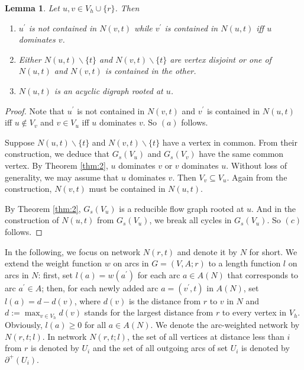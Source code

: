 \documentclass[11pt]{article}
\newtheorem{lemma}[theorem]{Lemma}
\begin{document}
\begin{lemma}
\label{lem:1}
Let $u,v\in V_h\cup\{r\}$. Then
\begin{enumerate}[label=\emph{(}\alph*\emph{)}]
  \item $u^\prime$ is not contained in $N(v,t)$ while $v^\prime$ is contained in $N(u,t)$ iff $u$ dominates $v$.
  \item Either $N(u,t)\backslash\{t\}$ and $N(v,t)\backslash\{t\}$ are vertex disjoint or one of $N(u,t)$ and $N(v,t)$ is contained in the other.
  \item $N(u,t)$ is an acyclic digraph rooted at $u$.
\end{enumerate}
\end{lemma}
\begin{proof}
Note that $u^\prime$ is not contained in $N(v,t)$ and $v^\prime$ is contained in $N(u,t)$ iff $u\not\in V_v$ and $v\in V_u$ iff $u$ dominates $v$. So $(a)$ follows.

Suppose $N(u,t)\backslash\{t\}$ and $N(v,t)\backslash\{t\}$ have a vertex in common. From their construction, we deduce that $G_s(V_u)$ and $G_s(V_v)$ have the same common vertex. By Theorem \ref{thm:2}, $u$ dominates $v$ or $v$ dominates $u$. Without loss of generality, we may assume that $u$ dominates $v$. Then $V_v\subseteq V_u$. Again from the construction, $N(v,t)$ must be contained in $N(u,t)$.

By Theorem \ref{thm:2}, $G_s(V_u)$ is a reducible flow graph rooted at $u$. And in the construction of $N(u,t)$ from $G_s(V_u)$, we break all cycles in $G_s(V_u)$. So $(c)$ follows.
\end{proof}

In the following, we focus on network $N(r,t)$ and denote it by $N$ for short. We extend the weight function $w$ on arcs in $G=(V,A;r)$ to a length function $l$ on arcs in $N$: first, set $l(a)=w(a^\prime)$ for each arc $a\in A(N)$ that corresponds to arc $a^\prime\in A$; then, for each newly added arc $a=(v^\prime,t)$ in $A(N)$, set $l(a)=d-d(v)$, where $d(v)$ is the distance from $r$ to $v$ in $N$ and $d:=\max_{v\in V_h} d(v)$ stands for the largest distance from $r$ to every vertex in $V_h$. Obviously, $l(a)\geq 0$ for all $a\in A(N)$. We denote the arc-weighted network by $N(r,t;l)$. In network $N(r,t;l)$, the set of all vertices at distance less than $i$ from $r$ is denoted by $U_i$ and the set of all outgoing arcs of set $U_i$ is denoted by $\partial^+(U_i)$.
\end{document}

